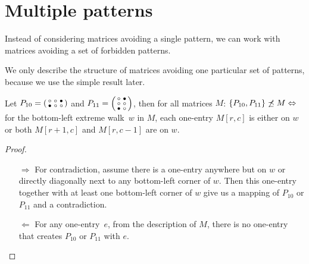 \section{Multiple patterns}
Instead of considering matrices avoiding a single pattern, we can work with matrices avoiding a set of forbidden patterns.

We only describe the structure of matrices avoiding one particular set of patterns, because we use the simple result later.

\begin{prop}
\label{prop:twopatterns}
Let $P_{10}=\left(\begin{smallmatrix}\circ&\circ&\bullet\\\bullet&\circ&\circ\end{smallmatrix}\right)$ and $P_{11}=\left(\begin{smallmatrix}\circ&\bullet\\\circ&\circ\\\bullet&\circ\end{smallmatrix}\right)$, then for all matrices $M$: $\{P_{10},P_{11}\}\not\preceq M\Leftrightarrow$ for the bottom-left extreme walk~$w$ in $M$, each one-entry $M[r,c]$ is either on $w$ or both $M[r+1,c]$ and $M[r,c-1]$ are on $w$.
\end{prop}
\begin{proof}
\begin{itemize}
	\item[$\Rightarrow$] For contradiction, assume there is a one-entry anywhere but on $w$ or directly diagonally next to any bottom-left corner of $w$. Then this one-entry together with at least one bottom-left corner of $w$ give us a mapping of $P_{10}$ or $P_{11}$ and a contradiction.
	\item[$\Leftarrow$] For any one-entry~$e$, from the description of $M$, there is no one-entry that creates $P_{10}$ or $P_{11}$ with $e$.
\end{itemize}
\end{proof}